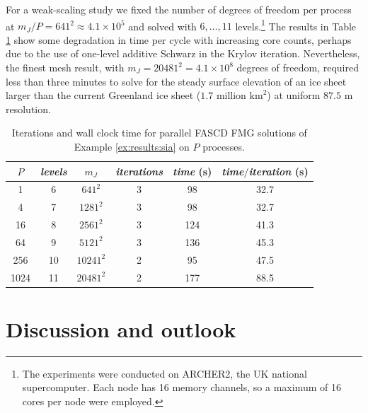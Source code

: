 \documentclass[review,hidelinks,onefignum,onetabnum,final]{siamart220329}  %
\begin{document}
\begin{example}
For a weak-scaling study we fixed the number of degrees of freedom per process at $m_J/P=641^2 \approx 4.1 \times 10^5$ and solved with $6, \dots, 11$ levels.\footnote{The experiments were conducted on ARCHER2, the UK national supercomputer. Each node has 16 memory channels, so a maximum of 16 cores per node were employed.}  The results in Table \ref{tab:results:siaweak} show some degradation in time per cycle with increasing core counts, perhaps due to the use of one-level additive Schwarz in the Krylov iteration.  Nevertheless, the finest mesh result, with $m_J=20481^2=4.1 \times 10^8$ degrees of freedom, required less than three minutes to solve for the steady surface elevation of an ice sheet larger than the current Greenland ice sheet ($1.7$ million $\text{km}^2$) at uniform $87.5$ m resolution.

\begin{table}[ht]
\centering
\begin{tabular}{c@{\hskip 4mm}c@{\hskip 4mm}c@{\hskip 7mm}c@{\hskip 4mm}cc}
\toprule
$P$ & \emph{levels} & $m_J$ & \emph{iterations} & \emph{time} (s) & \emph{time$/$iteration} (s) \\
\midrule
 1 & 6 & $641^2$ & 3 & 98 & 32.7 \\
 4 & 7 & $1281^2$ & 3 & 98 & 32.7 \\
 16 & 8 & $2561^2$ & 3 & 124 & 41.3 \\
 64 & 9 & $5121^2$ & 3 & 136 & 45.3 \\
 256 & 10 & $10241^2$ & 2 & 95 & 47.5 \\
 1024 & 11 & $20481^2$ & 2 & 177 & 88.5 \\
 \bottomrule
\end{tabular}
\bigskip
\caption{Iterations and wall clock time for parallel FASCD FMG solutions of Example \ref{ex:results:sia} on $P$ processes.}
\label{tab:results:siaweak}
\end{table}
\end{example}


\section{Discussion and outlook} \label{sec:discussion}
\end{document}
